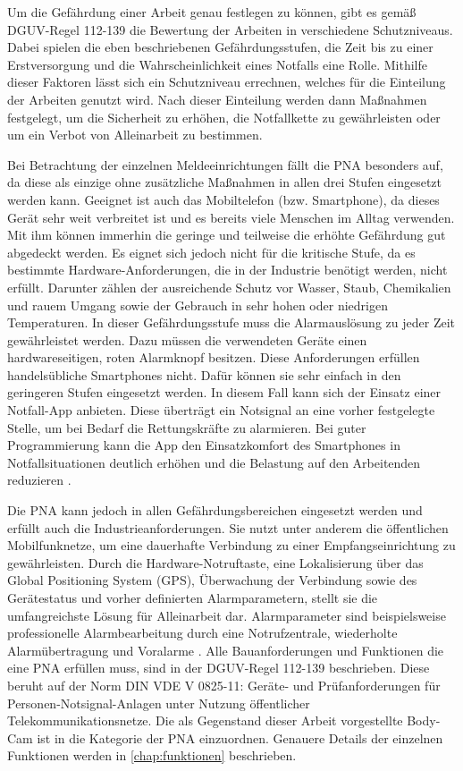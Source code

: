 \documentclass[thesis.tex]{subfiles}
\begin{document}
Um die Gefährdung einer Arbeit genau festlegen zu können, gibt es gemäß DGUV-Regel 112-139 \cite[][]{Regel_112-139} die Bewertung der Arbeiten in verschiedene Schutzniveaus.
Dabei spielen die eben beschriebenen Gefährdungsstufen, die Zeit bis zu einer Erstversorgung und die Wahrscheinlichkeit eines Notfalls eine Rolle.
Mithilfe dieser Faktoren lässt sich ein Schutzniveau errechnen, welches für die Einteilung der Arbeiten genutzt wird.
Nach dieser Einteilung werden dann Maßnahmen festgelegt, um die Sicherheit zu erhöhen, die Notfallkette zu gewährleisten oder um ein Verbot von Alleinarbeit zu bestimmen.

Bei Betrachtung der einzelnen Meldeeinrichtungen fällt die PNA besonders auf, da diese als einzige ohne zusätzliche Maßnahmen in allen drei Stufen eingesetzt werden kann.
Geeignet ist auch das Mobiltelefon (bzw. Smartphone), da dieses Gerät sehr weit verbreitet ist und es bereits viele Menschen im Alltag verwenden.
Mit ihm können immerhin die geringe und teilweise die erhöhte Gefährdung gut abgedeckt werden.
Es eignet sich jedoch nicht für die kritische Stufe, da es bestimmte Hardware-Anforderungen, die in der Industrie benötigt werden, nicht erfüllt.
Darunter zählen der ausreichende Schutz vor Wasser, Staub, Chemikalien und rauem Umgang sowie der Gebrauch in sehr hohen oder niedrigen Temperaturen.
In dieser Gefährdungsstufe muss die Alarmauslösung zu jeder Zeit gewährleistet werden.
Dazu müssen die verwendeten Geräte einen hardwareseitigen, roten Alarmknopf besitzen.
Diese Anforderungen erfüllen handelsübliche Smartphones nicht.
Dafür können sie sehr einfach in den geringeren Stufen eingesetzt werden.
In diesem Fall kann sich der Einsatz einer Notfall-App anbieten.
Diese überträgt ein Notsignal an eine vorher festgelegte Stelle, um bei Bedarf die Rettungskräfte zu alarmieren.
Bei guter Programmierung kann die App den Einsatzkomfort des Smartphones in Notfallsituationen deutlich erhöhen und die Belastung auf den Arbeitenden reduzieren \cite[vgl.~S~.2-5][]{FAQ-PNAuAPP}.

Die PNA kann jedoch in allen Gefährdungsbereichen eingesetzt werden und erfüllt auch die Industrieanforderungen.
Sie nutzt unter anderem die öffentlichen Mobilfunknetze, um eine dauerhafte Verbindung zu einer Empfangseinrichtung zu gewährleisten.
Durch die Hardware-Notruftaste, eine Lokalisierung über das \glqq Global Positioning System\grqq{} (GPS), Überwachung der Verbindung sowie des Gerätestatus und vorher definierten Alarmparametern, stellt sie die umfangreichste Lösung für Alleinarbeit dar.
Alarmparameter sind beispielsweise professionelle Alarmbearbeitung durch eine Notrufzentrale, wiederholte Alarmübertragung und Voralarme \cite[vgl.~S.~2-5][]{FAQ-PNAuAPP}.
Alle Bauanforderungen und Funktionen die eine PNA erfüllen muss, sind in der DGUV-Regel 112-139 \cite[][]{Regel_112-139} beschrieben.
Diese beruht auf der Norm \glqq DIN VDE V 0825-11: Geräte- und Prüfanforderungen für Personen-Notsignal-Anlagen unter Nutzung öffentlicher Telekommunikationsnetze\grqq{}.
Die als Gegenstand dieser Arbeit vorgestellte Body-Cam ist in die Kategorie der PNA einzuordnen.
Genauere Details der einzelnen Funktionen werden in \autoref{chap:funktionen} beschrieben.
\end{document}
